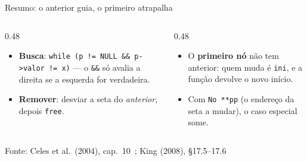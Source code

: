 \documentclass[aspectratio=169]{beamer}
\newcommand{\fonte}[1]{\vfill\hfill{\scriptsize\textcolor{UFSGray}{Fonte: #1}}}
\begin{document}
\begin{frame}{Resumo: o anterior guia, o primeiro atrapalha}
  \begin{center}
  \end{center}
  \begin{columns}[T]
    \begin{column}{0.48\textwidth}
      \small
      \begin{itemize}
        \item \textbf{Busca}: \texttt{while (p != NULL \&\& p->valor != x)}
          --- o \texttt{\&\&} só avalia a direita se a esquerda for verdadeira.
        \item \textbf{Remover}: desviar a seta do \emph{anterior}, depois
          \texttt{free}.
      \end{itemize}
    \end{column}
    \begin{column}{0.48\textwidth}
      \small
      \begin{itemize}
        \item O \textbf{primeiro nó} não tem anterior: quem muda é
          \texttt{ini}, e a função devolve o novo início.
        \item Com \texttt{No **pp} (o endereço da seta a mudar), o caso
          especial some.
      \end{itemize}
    \end{column}
  \end{columns}
  \fonte{Celes et al.\ (2004), cap.~10~\cite{celes2004introducao}; King (2008), §17.5--17.6~\cite{king2008c}}
\end{frame}
\end{document}
